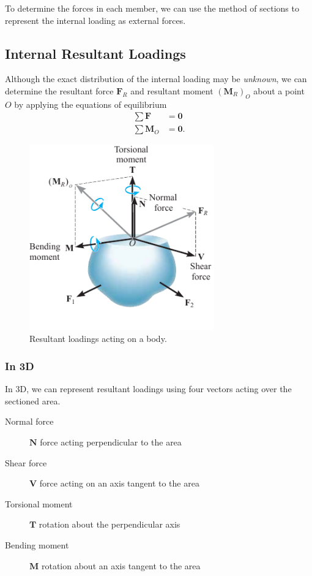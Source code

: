 \documentclass{article}
\begin{document}
To determine the forces in each member, we can use the method of sections to represent the internal loading as external forces.
\subsection{Internal Resultant Loadings}
Although the exact distribution of the internal loading may be \textit{unknown}, we can determine the
resultant force \(\symbf{F}_R\) and resultant moment \(\left( \symbf{M}_R \right)_O\) about a point \(O\) by applying the
equations of equilibrium
\begin{align*}
    \sum \symbf{F}   & = \symbf{0}  \\
    \sum \symbf{M}_O & = \symbf{0}.
\end{align*}
\begin{figure}[H]
    \centering
    \includegraphics[height = 8cm, keepaspectratio = true]{figures/resultant_loadings.pdf}
    \caption{Resultant loadings acting on a body.}
\end{figure}
\subsubsection{In 3D}
In 3D, we can represent resultant loadings using four vectors acting over the sectioned area.
\begin{description}
    \item[Normal force] \(\symbf{N}\) force acting perpendicular to the area
    \item[Shear force] \(\symbf{V}\) force acting on an axis tangent to the area
    \item[Torsional moment] \(\symbf{T}\) rotation about the perpendicular axis
    \item[Bending moment] \(\symbf{M}\) rotation about an axis tangent to the area
\end{description}
\end{document}
